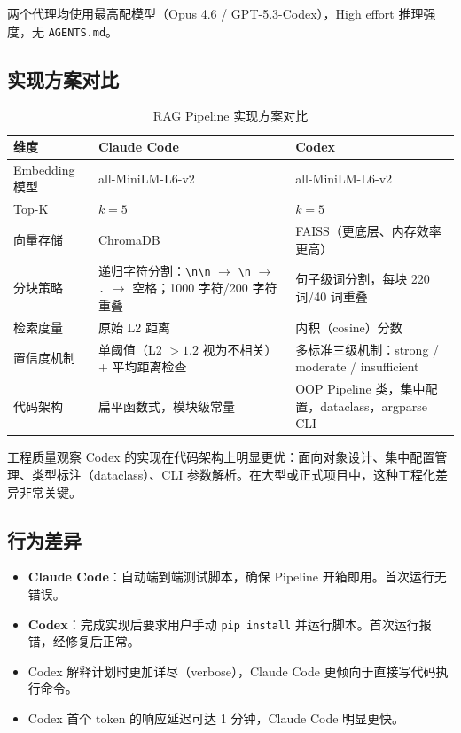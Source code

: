 \documentclass[a4paper]{article}
\begin{document}
两个代理均使用最高配模型（Opus 4.6 / GPT-5.3-Codex），High effort 推理强度，无 \texttt{AGENTS.md}。

\subsection{实现方案对比}

\begin{table}[H]
\centering
\caption{RAG Pipeline 实现方案对比}
\begin{tabular}{lp{5cm}p{5cm}}
\toprule
\textbf{维度} & \textbf{Claude Code} & \textbf{Codex} \\
\midrule
Embedding 模型 & all-MiniLM-L6-v2 & all-MiniLM-L6-v2 \\
\addlinespace
Top-K & $k=5$ & $k=5$ \\
\addlinespace
向量存储 & ChromaDB & FAISS（更底层、内存效率更高） \\
\addlinespace
分块策略 & 递归字符分割：\texttt{\textbackslash n\textbackslash n} $\to$ \texttt{\textbackslash n} $\to$ \texttt{.} $\to$ 空格；1000 字符/200 字符重叠 & 句子级词分割，每块 220 词/40 词重叠 \\
\addlinespace
检索度量 & 原始 L2 距离 & 内积（cosine）分数 \\
\addlinespace
置信度机制 & 单阈值（L2 $> 1.2$ 视为不相关）+ 平均距离检查 & 多标准三级机制：strong / moderate / insufficient \\
\addlinespace
代码架构 & 扁平函数式，模块级常量 & OOP Pipeline 类，集中配置，dataclass，argparse CLI \\
\bottomrule
\end{tabular}
\end{table}

\begin{knowledgebox}{工程质量观察}
Codex 的实现在代码架构上明显更优：面向对象设计、集中配置管理、类型标注（dataclass）、CLI 参数解析。在大型或正式项目中，这种工程化差异非常关键。
\end{knowledgebox}

\subsection{行为差异}

\begin{itemize}
    \item \textbf{Claude Code}：自动端到端测试脚本，确保 Pipeline 开箱即用。首次运行无错误。
    \item \textbf{Codex}：完成实现后要求用户手动 \texttt{pip install} 并运行脚本。首次运行报错，经修复后正常。
    \item Codex 解释计划时更加详尽（verbose），Claude Code 更倾向于直接写代码执行命令。
    \item Codex 首个 token 的响应延迟可达 1 分钟，Claude Code 明显更快。
\end{itemize}
\end{document}
